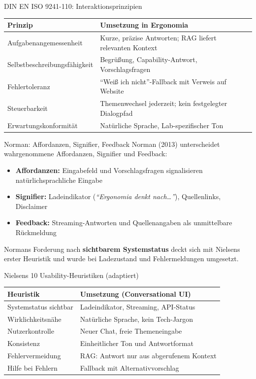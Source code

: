 \documentclass[14pt,aspectratio=169]{beamer}
\begin{document}
\begin{frame}{DIN EN ISO 9241-110: Interaktionsprinzipien}
    \small
    \begin{tabularx}{\textwidth}{@{}l X@{}}
        \toprule
        \textbf{Prinzip} & \textbf{Umsetzung in Ergonomia} \\
        \midrule
        Aufgabenangemessenheit & Kurze, präzise Antworten; RAG liefert relevanten Kontext \\
        Selbstbeschreibungsfähigkeit & Begrüßung, Capability-Antwort, Vorschlagsfragen \\
        Fehlertoleranz & ``Weiß ich nicht''-Fallback mit Verweis auf Website \\
        Steuerbarkeit & Themenwechsel jederzeit; kein festgelegter Dialogpfad \\
        Erwartungskonformität & Natürliche Sprache, Lab-spezifischer Ton \\
        \bottomrule
    \end{tabularx}
    \normalsize
\end{frame}

\begin{frame}{Norman: Affordanzen, Signifier, Feedback}
    Norman (2013) unterscheidet wahrgenommene Affordanzen, Signifier und Feedback:
    \begin{itemize}
        \item \textbf{Affordanzen:} Eingabefeld und Vorschlagsfragen signalisieren natürlichsprachliche Eingabe
        \item \textbf{Signifier:} Ladeindikator (\textit{``Ergonomia denkt nach\ldots''}), Quellenlinks, Disclaimer
        \item \textbf{Feedback:} Streaming-Antworten und Quellenangaben als unmittelbare Rückmeldung
    \end{itemize}
    \vspace{0.3cm}
    Normans Forderung nach \textbf{sichtbarem Systemstatus} deckt sich mit Nielsens erster Heuristik und wurde bei Ladezustand und Fehlermeldungen umgesetzt.
\end{frame}

\begin{frame}{Nielsens 10 Usability-Heuristiken (adaptiert)}
    \small
    \begin{tabularx}{\textwidth}{@{}l X@{}}
        \toprule
        \textbf{Heuristik} & \textbf{Umsetzung (Conversational UI)} \\
        \midrule
        Systemstatus sichtbar & Ladeindikator, Streaming, API-Status \\
        Wirklichkeitsnähe & Natürliche Sprache, kein Tech-Jargon \\
        Nutzerkontrolle & Neuer Chat, freie Themeneingabe \\
        Konsistenz & Einheitlicher Ton und Antwortformat \\
        Fehlervermeidung & RAG: Antwort nur aus abgerufenem Kontext \\
        Hilfe bei Fehlern & Fallback mit Alternativvorschlag \\
        \bottomrule
    \end{tabularx}
    \normalsize
\end{frame}
\end{document}
